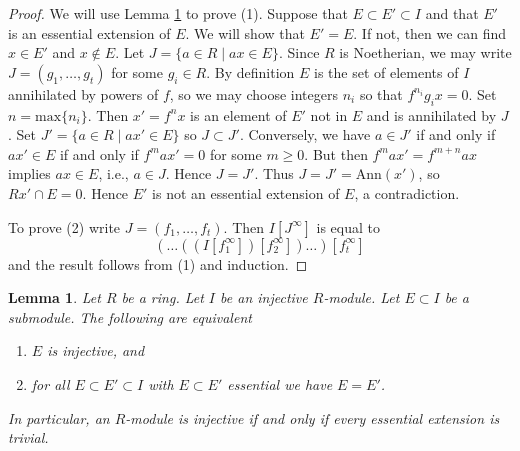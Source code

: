 \documentclass{amsart}
\theoremstyle{plain}
\newtheorem{lemma}[subsection]{Lemma}
\theoremstyle{definition}
\theoremstyle{remark}
\numberwithin{equation}{subsection}
\begin{document}
\begin{proof}
We will use Lemma \ref{lemma-essential-extensions-in-injective}
to prove (1).
Suppose that $E \subset E' \subset I$ and that $E'$ is an essential
extension of $E$. We will show that $E' = E$. If not, then we can
find $x \in E'$ and $x \not \in E$.
Let $J = \{ a \in R \mid ax \in E\}$. Since $R$ is Noetherian,
we may write $J = (g_1, \ldots, g_t)$ for some
$g_i \in R$. By definition $E$ is the set of elements of $I$ annihilated
by powers of $f$, so we may choose integers $n_i$ so that $f^{n_i}g_ix = 0$.
Set $n = \mathrm{max}\{ n_i \}$. Then $x' = f^n x$ is an element of $E'$
not in $E$ and is annihilated by $J$. Set $J' = \{ a \in R \mid ax' \in E \}$
so $J \subset J'$. Conversely, we have $a \in J'$ if and only if $ax' \in E$
if and only if $f^m a x' = 0$ for some $m \geq 0$. But then
$f^m a x' = f^{m + n} a x$ implies $ax \in E$, i.e., $a \in J$.
Hence $J = J'$. Thus $J = J' = \text{Ann}(x')$, so $Rx' \cap E  = 0$.
Hence $E'$ is not an essential extension of $E$, a contradiction.

\medskip\noindent
To prove (2) write $J = (f_1, \ldots, f_t)$. Then
$I[J^\infty]$ is equal to
$$
(\ldots((I[f_1^\infty])[f_2^\infty])\ldots)[f_t^\infty]
$$
and the result follows from (1) and induction.
\end{proof}


\begin{lemma}
\label{lemma-essential-extensions-in-injective}
Let $R$ be a ring. Let $I$ be an injective $R$-module. Let $E \subset I$
be a submodule. The following are equivalent
\begin{enumerate}
\item $E$ is injective, and
\item for all $E \subset E' \subset I$ with $E \subset E'$ essential
we have $E = E'$.
\end{enumerate}
In particular, an $R$-module is injective if and only if every essential
extension is trivial.
\end{lemma}
\end{document}
